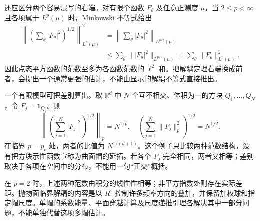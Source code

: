 \ProseParagraphBreak
还应区分两个容易混写的右端。对有限个函数 \(F_\theta\) 及任意正测度 \(\mu\)，当 \(2\leq p<\infty\) 且各项属于 \(L^p(\mu)\) 时，Minkowski 不等式给出
\[
 \begin{aligned}
 \left\|\left(\sum_\theta|F_\theta|^2\right)^{1/2}\right\|_{L^p(\mu)}^2
 &=\left\|\sum_\theta|F_\theta|^2\right\|_{L^{p/2}(\mu)}\\
 &\leq\sum_\theta
       \bigl\||F_\theta|^2\bigr\|_{L^{p/2}(\mu)}
 =\sum_\theta\|F_\theta\|_{L^p(\mu)}^2.
 \end{aligned}
\]
因此点态平方函数的范数至多为各函数范数的 \(\ell^2\) 和。把解耦定理右端换成前者，会提出一个通常更强的估计，不能由显示的解耦不等式直接推出。

\ProseParagraphBreak
一个有限模型可把差别算出。取 \(\mathbb R^d\) 中 \(N\) 个互不相交、体积为一的方块 \(Q_1,\ldots,Q_N\)，令 \(F_j=\mathbf1_{Q_j}\)。则
\[
 \left\|\left(\sum_{j=1}^N|F_j|^2\right)^{1/2}\right\|_p=N^{1/p},
 \quad
 \left(\sum_{j=1}^N\|F_j\|_p^2\right)^{1/2}=N^{1/2}.
\]
在临界 \(p=p_c\) 处，两者的比值为 \(N^{1/(d+1)}\)。这个例子只比较两种范数结构，没有把方块示性函数宣称为曲面帽的延拓。若各个 \(F_j\) 完全相同，两者又相等；差别取决于各项在空间中的分布，不能用一句“正交”概括。

\ProseParagraphBreak
在 \(p=2\) 时，上述两种范数由积分的线性性相等；非平方指数处则存在实际差距。抛物面临界解耦的内容是以 \(R^\varepsilon\) 控制许多频率方向的叠加，并保留加权球和指定帽尺度。单帽的系数能量、平面穿越计算及尺度递推引理各解决其中一部分问题，不能单独代替这项多帽估计。
